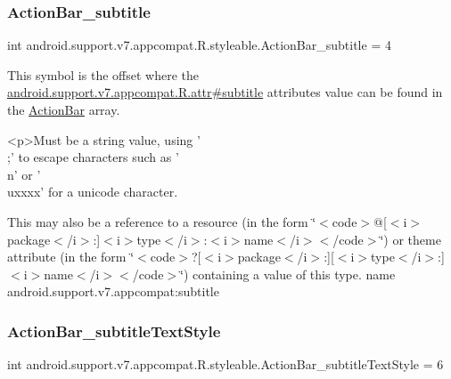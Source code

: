 \subsubsection{\texorpdfstring{Action\+Bar\+\_\+subtitle}{ActionBar\_subtitle}}
{\footnotesize\ttfamily int android.\+support.\+v7.\+appcompat.\+R.\+styleable.\+Action\+Bar\+\_\+subtitle = 4\hspace{0.3cm}{\ttfamily [static]}}

This symbol is the offset where the \hyperlink{classandroid_1_1support_1_1v7_1_1appcompat_1_1R_1_1attr_ab53f3a776c038849bb98b7bf21a4597f}{android.\+support.\+v7.\+appcompat.\+R.\+attr\#subtitle} attribute\textquotesingle{}s value can be found in the \hyperlink{classandroid_1_1support_1_1v7_1_1appcompat_1_1R_1_1styleable_a5941dc15714398e9ec9afaa0155cc1cf}{Action\+Bar} array.

\begin{DoxyVerb}      <p>Must be a string value, using '\\;' to escape characters such as '\\n' or '\\uxxxx' for a unicode character.
\end{DoxyVerb}
 

This may also be a reference to a resource (in the form \char`\"{}$<$code$>$@\mbox{[}$<$i$>$package$<$/i$>$\+:\mbox{]}$<$i$>$type$<$/i$>$\+:$<$i$>$name$<$/i$>$$<$/code$>$\char`\"{}) or theme attribute (in the form \char`\"{}$<$code$>$?\mbox{[}$<$i$>$package$<$/i$>$\+:\mbox{]}\mbox{[}$<$i$>$type$<$/i$>$\+:\mbox{]}$<$i$>$name$<$/i$>$$<$/code$>$\char`\"{}) containing a value of this type.  name android.\+support.\+v7.\+appcompat\+:subtitle \mbox{\label{classandroid_1_1support_1_1v7_1_1appcompat_1_1R_1_1styleable_ae699f5e7552d0d0606b59fa333bcde13}} 
\subsubsection{\texorpdfstring{Action\+Bar\+\_\+subtitle\+Text\+Style}{ActionBar\_subtitleTextStyle}}
{\footnotesize\ttfamily int android.\+support.\+v7.\+appcompat.\+R.\+styleable.\+Action\+Bar\+\_\+subtitle\+Text\+Style = 6\hspace{0.3cm}{\ttfamily [static]}}

